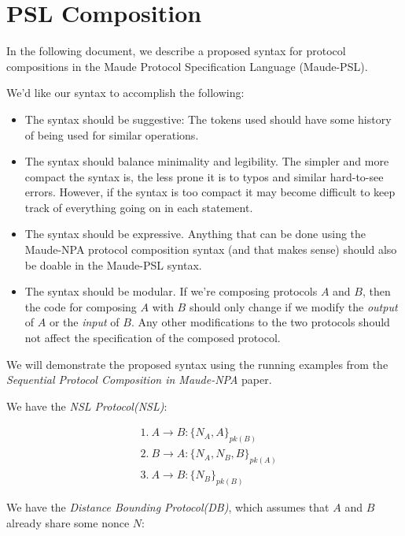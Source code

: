 \documentclass{article}
\begin{document}
\section{PSL Composition}

In the following document, we describe a proposed syntax for protocol
compositions in the Maude Protocol Specification Language (Maude-PSL).

We'd like our syntax to accomplish the following:

\begin{itemize}
    \item The syntax should be suggestive: The tokens used should have some
        history of being used for similar operations.
    \item The syntax should balance minimality and legibility. The 
        simpler and more compact the syntax is, the less prone it is to typos 
        and similar hard-to-see errors. However, if the syntax is too compact
        it may become difficult to keep track of everything going on in 
        each statement.
    \item The syntax should be expressive. Anything that can be done using
        the Maude-NPA protocol composition syntax (and that makes sense) should
        also be doable in the Maude-PSL syntax.
    \item The syntax should be modular. If we're composing protocols $A$ and
        $B$, then the code for composing $A$ with $B$ should only change if
        we modify the \emph{output} of $A$ or the \emph{input} of $B$. 
        Any other modifications to the two protocols should not affect 
        the specification of the composed protocol.
\end{itemize}

We will demonstrate the proposed syntax using the running examples from the
\textit{Sequential Protocol Composition in Maude-NPA} paper. 

We have the \textit{NSL Protocol(NSL)}:

\begin{align*}
    &1.~A \rightarrow B : \{N_A, A\}_{pk(B)}\\
    &2.~B \rightarrow A : \{N_A, N_B, B\}_{pk(A)}\\
    &3.~A \rightarrow B : \{N_B\}_{pk(B)}
\end{align*}

We have the \textit{Distance Bounding Protocol(DB)}, which assumes that
$A$ and $B$ already share some nonce $N$:
\end{document}
